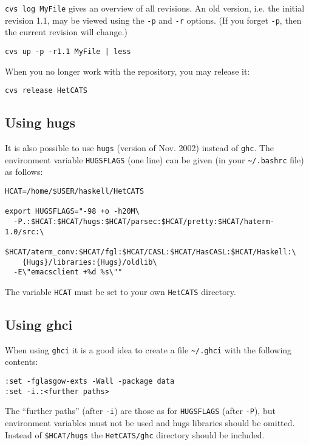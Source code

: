 \documentclass{article}
\begin{document}
\texttt{cvs log MyFile} gives an overview of all revisions. An old
version, i.e. the initial revision 1.1, may be viewed using the
\texttt{-p} and \texttt{-r} options. (If you forget \texttt{-p}, then the
current revision will change.)

\begin{verbatim}
cvs up -p -r1.1 MyFile | less
\end{verbatim}

When you no longer work with the repository, you may release it:

\begin{verbatim}
cvs release HetCATS
\end{verbatim}

\subsection{Using hugs}

It is also possible to use \texttt{hugs} (version of Nov. 2002) instead of
\texttt{ghc}.  The environment variable \texttt{HUGSFLAGS} (one line) can be
given (in your \texttt{\~{}/.bashrc} file) as follows:

\begin{verbatim}
HCAT=/home/$USER/haskell/HetCATS

export HUGSFLAGS="-98 +o -h20M\
  -P.:$HCAT:$HCAT/hugs:$HCAT/parsec:$HCAT/pretty:$HCAT/haterm-1.0/src:\
    $HCAT/aterm_conv:$HCAT/fgl:$HCAT/CASL:$HCAT/HasCASL:$HCAT/Haskell:\
    {Hugs}/libraries:{Hugs}/oldlib\
  -E\"emacsclient +%d %s\""
\end{verbatim}

The variable \texttt{HCAT} must be set to your own \texttt{HetCATS} directory.

\subsection{Using ghci}

When using \texttt{ghci} it is a good idea to create a file
\texttt{\~{}/.ghci} with the following contents:

\begin{verbatim}
:set -fglasgow-exts -Wall -package data 
:set -i.:<further paths>
\end{verbatim}

The ``further paths'' (after \texttt{-i}) are those as for \texttt{HUGSFLAGS}
(after \texttt{-P}), but environment variables must not be used and hugs
libraries should be omitted. Instead of \texttt{\$HCAT/hugs} the
\texttt{HetCATS/ghc} directory should be included.
\end{document}
